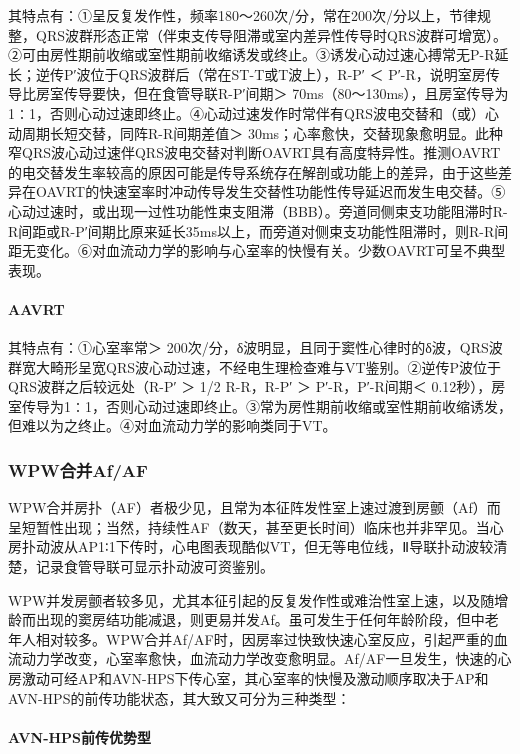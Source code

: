 其特点有：①呈反复发作性，频率180～260次/分，常在200次/分以上，节律规整，QRS波群形态正常（伴束支传导阻滞或室内差异性传导时QRS波群可增宽）。②可由房性期前收缩或室性期前收缩诱发或终止。③诱发心动过速心搏常无P-R延长；逆传P′波位于QRS波群后（常在ST-T或T波上），R-P′
＜ P′-R，说明室房传导比房室传导要快，但在食管导联R-P′间期＞
70ms（80～130ms），且房室传导为1∶1，否则心动过速即终止。④心动过速发作时常伴有QRS波电交替和（或）心动周期长短交替，同阵R-R间期差值＞
30ms；心率愈快，交替现象愈明显。此种窄QRS波心动过速伴QRS波电交替对判断OAVRT具有高度特异性。推测OAVRT的电交替发生率较高的原因可能是传导系统存在解剖或功能上的差异，由于这些差异在OAVRT的快速室率时冲动传导发生交替性功能性传导延迟而发生电交替。⑤心动过速时，或出现一过性功能性束支阻滞（BBB）。旁道同侧束支功能阻滞时R-R间距或R-P′间期比原来延长35ms以上，而旁道对侧束支功能性阻滞时，则R-R间距无变化。⑥对血流动力学的影响与心室率的快慢有关。少数OAVRT可呈不典型表现。

\paragraph{AAVRT}

其特点有：①心室率常＞
200次/分，δ波明显，且同于窦性心律时的δ波，QRS波群宽大畸形呈宽QRS波心动过速，不经电生理检查难与VT鉴别。②逆传P波位于QRS波群之后较远处（R-P′
＞ 1/2 R-R，R-P′ ＞ P′-R，P′-R间期＜
0.12秒），房室传导为1∶1，否则心动过速即终止。③常为房性期前收缩或室性期前收缩诱发，但难以为之终止。④对血流动力学的影响类同于VT。

\subsubsection{WPW合并Af/AF}

WPW合并房扑（AF）者极少见，且常为本征阵发性室上速过渡到房颤（Af）而呈短暂性出现；当然，持续性AF（数天，甚至更长时间）临床也并非罕见。当心房扑动波从AP1∶1下传时，心电图表现酷似VT，但无等电位线，Ⅱ导联扑动波较清楚，记录食管导联可显示扑动波可资鉴别。

WPW并发房颤者较多见，尤其本征引起的反复发作性或难治性室上速，以及随增龄而出现的窦房结功能减退，则更易并发Af。虽可发生于任何年龄阶段，但中老年人相对较多。WPW合并Af/AF时，因房率过快致快速心室反应，引起严重的血流动力学改变，心室率愈快，血流动力学改变愈明显。Af/AF一旦发生，快速的心房激动可经AP和AVN-HPS下传心室，其心室率的快慢及激动顺序取决于AP和AVN-HPS的前传功能状态，其大致又可分为三种类型：

\paragraph{AVN-HPS前传优势型}

